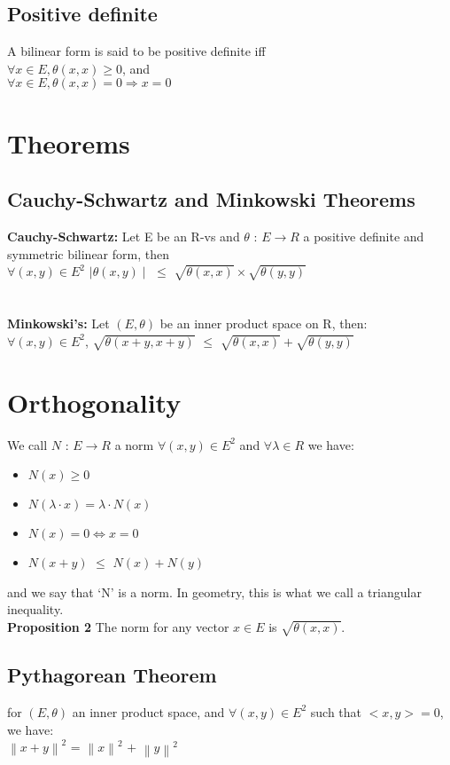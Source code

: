 \documentclass{article}
\begin{document}
\subsection{Positive definite}
A bilinear form is said to be positive definite iff\\
$\forall x \in E, \theta(x,x) \geq 0$, and \\
$\forall x \in E, \theta(x,x) = 0 \Longrightarrow x = 0$\\
\section{Theorems}
\subsection{Cauchy-Schwartz and Minkowski Theorems}
\textbf{Cauchy-Schwartz:} Let E be an R-vs and $\theta$ : $E \rightarrow R$ a positive definite and symmetric bilinear form, then\\
$\forall (x,y) \in E^2$ $\mid\theta (x,y)\mid$ $\leq$ $\sqrt{\theta(x,x)} \times \sqrt{\theta(y,y)}$\\
\\
\\
\textbf{Minkowski's:} Let $(E,\theta)$ be an inner product space on R, then:\\
$\forall (x,y) \in E^2$, $\sqrt{\theta(x + y, x + y)}$ $\leq$ $\sqrt{\theta(x,x)} + \sqrt{\theta(y,y)}$\\
\section{Orthogonality}
We call $N$ : $E \rightarrow R$ a norm $\forall (x,y) \in E^2$ and $\forall \lambda \in R $ we have:\\
\begin{itemize}
    \item $N(x) \geq 0$
    \item $N(\lambda \cdot x) = \lambda \cdot N(x)$
    \item $N(x) = 0 \iff x = 0$
    \item $N(x + y)$ $\leq$ $N(x) + N(y)$
\end{itemize}
and we say that `N' is a norm. In geometry, this is what we call a triangular inequality.\\
\textbf{Proposition 2} The norm for any vector $x \in E$ is $\sqrt{\theta(x,x)}$.\\
\subsection{Pythagorean Theorem}
for $(E, \theta)$ an inner product space, and $\forall (x,y) \in E^2$ such that $<x,y> = 0$, we have:\\
$\left\lVert x + y \right\rVert ^2$ = $\left\lVert x \right\rVert ^ 2$ $ + $ $\left\lVert y \right\rVert ^ 2$\\
\end{document}
